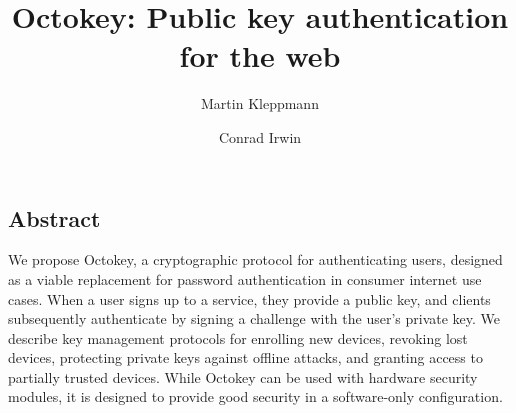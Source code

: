\documentclass[letterpaper,twocolumn,10pt]{article}
\begin{document}
\date{} %
\title{\Large \bf Octokey: Public key authentication for the web}
\author{{\rm Martin Kleppmann} \and {\rm Conrad Irwin}}
\maketitle

\subsection*{Abstract}

We propose Octokey, a cryptographic protocol for authenticating users, designed as a viable
replacement for password authentication in consumer internet use cases. When a user signs up to a
service, they provide a public key, and clients subsequently authenticate by signing a challenge
with the user's private key. We describe key management protocols for enrolling new devices,
revoking lost devices, protecting private keys against offline attacks, and granting access to
partially trusted devices. While Octokey can be used with hardware security modules, it is designed
to provide good security in a software-only configuration.





%


{\footnotesize
    
    {}
}
\end{document}
